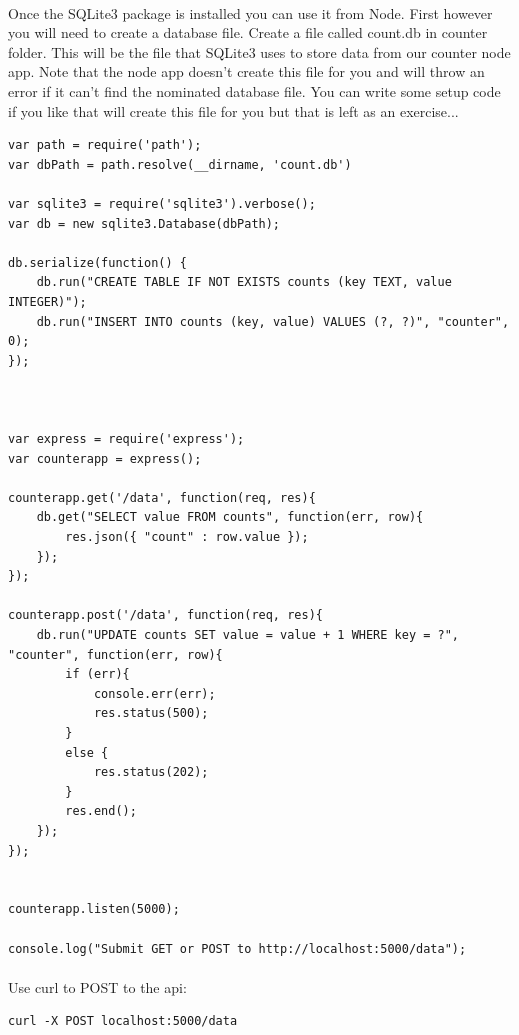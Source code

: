 \documentclass[10pt, a4paper, twosize]{article}
\begin{document}
\paragraph{} Once the SQLite3 package is installed you can use it from Node. First however you will need to create a database file. Create a file called count.db in counter folder. This will be the file that SQLite3 uses to store data from our counter node app. Note that the node app doesn't create this file for you and will throw an error if it can't find the nominated database file. You can write some setup code if you like that will create this file for you but that is left as an exercise...

\begin{lstlisting}
var path = require('path');
var dbPath = path.resolve(__dirname, 'count.db')

var sqlite3 = require('sqlite3').verbose();
var db = new sqlite3.Database(dbPath);

db.serialize(function() {
    db.run("CREATE TABLE IF NOT EXISTS counts (key TEXT, value INTEGER)");
    db.run("INSERT INTO counts (key, value) VALUES (?, ?)", "counter", 0);
});



var express = require('express');
var counterapp = express();

counterapp.get('/data', function(req, res){
    db.get("SELECT value FROM counts", function(err, row){
        res.json({ "count" : row.value });
    });
});

counterapp.post('/data', function(req, res){
    db.run("UPDATE counts SET value = value + 1 WHERE key = ?", "counter", function(err, row){
        if (err){
            console.err(err);
            res.status(500);
        }
        else {
            res.status(202);
        }
        res.end();
    });
});


counterapp.listen(5000);

console.log("Submit GET or POST to http://localhost:5000/data");

\end{lstlisting}


\paragraph{} Use curl to POST to the api:

\begin{lstlisting}[style=DOS]
    curl -X POST localhost:5000/data
\end{lstlisting}
\end{document}
